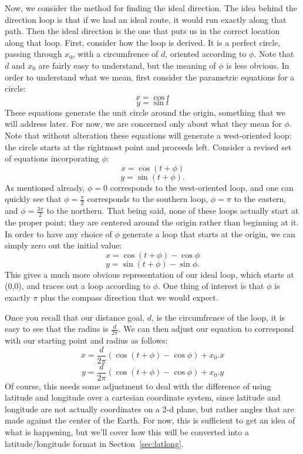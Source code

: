 \documentclass[twocolumn,11pt]{article}
\begin{document}
Now, we consider the method for finding the ideal direction. The idea behind the
direction loop is that if we had an ideal route, it would run exactly along that
path. Then the ideal direction is the one that puts us in the correct location
along that loop. First, consider how the loop is derived. It is a perfect
circle, passing through $x_0$, with a circumfrence of $d$, oriented according to
$\phi$. Note that $d$ and $x_0$ are fairly easy to understand, but the meaning
 of $\phi$ is less obvious. In order to understand what we mean, first consider
the parametric equations for a circle:
\[ x = \cos t \]
\[ y = \sin t \]
These equations generate the unit circle around the origin, something that we
will address later. For now, we are concerned only about what they mean for
$\phi$. Note that without alteration these equations will generate a
west-oriented loop: the circle starts at the rightmost point and proceeds left.
Consider a revised set of equations incorporating $\phi$:
\[ x = \cos (t + \phi) \]
\[ y = \sin (t + \phi). \]
As mentioned already, $\phi = 0$ corresponds to the west-oriented loop, and one
can quickly see that $\phi = \frac{\pi}{2}$ corresponds to the southern loop,
$\phi = \pi$ to the eastern, and $\phi = \frac{3\pi}{2}$ to the northern. That
being said, none of these loops actually start at the proper point; they are
centered around the origin rather than beginning at it. In order to have any
choice of $\phi$ generate a loop that starts at the origin, we can simply zero
out the initial value:
\[ x = \cos (t + \phi) - \cos \phi \]
\[ y = \sin ( t + \phi ) - \sin \phi. \]
This gives a much more obvious representation of our ideal loop, which starts
at (0,0), and traces out a loop according to $\phi$. One thing of interest is
that $\phi$ is exactly $\pi$ plus the compass direction that we would expect.

Once you recall that our distance goal, $d$, is the circumfrence of the loop,
it is easy to see that the radius is $\frac{d}{2\pi}$. We can then adjust our
equation to correspond with our starting point and radius as follows:
\[ x = \frac{d}{2\pi}(\cos ( t + \phi ) - \cos \phi ) + x_0.x \]
\[ y = \frac{d}{2\pi}(\cos ( t + \phi ) - \cos \phi ) + x_0.y \]
Of course, this needs some adjustment to deal with the difference of using
latitude and longitude over a cartesian coordinate system, since latitude
and longitude are not actually coordinates on a 2-d plane, but rather angles
that are made against the center of the Earth. For now, this is sufficient to
get an idea of what is happening, but we'll cover how this will be converted
into a latitude/longitude format in Section~\ref{sec:latlong}.
\end{document}
